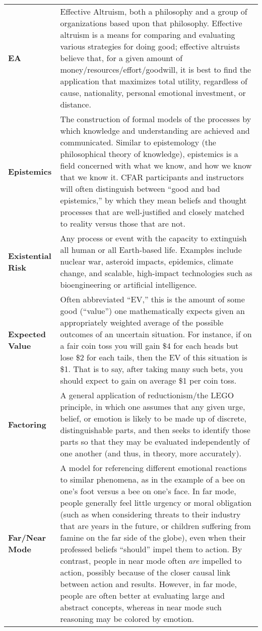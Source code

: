\begin{longtable} { p{} p{} }
\textbf{EA} & Effective Altruism, both a philosophy and a group of organizations based upon that philosophy.  Effective altruism is a means for comparing and evaluating various strategies for doing good; effective altruists believe that, for a given amount of money/resources/effort/goodwill, it is best to find the application that maximizes total utility, regardless of cause, nationality, personal emotional investment, or distance.\\

\textbf{Epistemics} & The construction of formal models of the processes by which knowledge and understanding are achieved and communicated.  Similar to epistemology (the philosophical theory of knowledge), epistemics is a field concerned with what we know, and how we know that we know it.  CFAR participants and instructors will often distinguish between ``good and bad epistemics,'' by which they mean beliefs and thought processes that are well-justified and closely matched to reality versus those that are not.\\

\textbf{Existential Risk} & Any process or event with the capacity to extinguish all human or all Earth-based life.  Examples include nuclear war, asteroid impacts, epidemics, climate change, and scalable, high-impact technologies such as bioengineering or artificial intelligence.\\

\textbf{Expected Value} & Often abbreviated ``EV,'' this is the amount of some good (``value'') one mathematically expects given an appropriately weighted average of the possible outcomes of an uncertain situation. For instance, if on a fair coin toss you will gain \$4 for each heads but lose \$2 for each tails, then the EV of this situation is \$1. That is to say, after taking many such bets, you should expect to gain on average \$1 per coin toss.\\

\textbf{Factoring} & A general application of reductionism/the LEGO principle, in which one assumes that any given urge, belief, or emotion is likely to be made up of discrete, distinguishable parts, and then seeks to identify those parts so that they may be evaluated independently of one another (and thus, in theory, more accurately).\\

\textbf{Far/Near Mode} & A model for referencing different emotional reactions to similar phenomena, as in the example of a bee on one's foot versus a bee on one's face.  In far mode, people generally feel little urgency or moral obligation (such as when considering threats to their industry that are years in the future, or children suffering from famine on the far side of the globe), even when their professed beliefs ``should'' impel them to action.  By contrast, people in near mode often \emph{are} impelled to action, possibly because of the closer causal link between action and results.  However, in far mode, people are often better at evaluating large and abstract concepts, whereas in near mode such reasoning may be colored by emotion.\\


\end{longtable}
